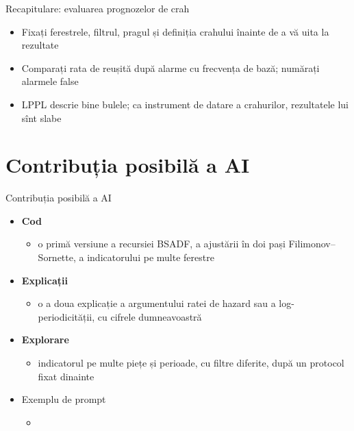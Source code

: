 \begin{frame}{Recapitulare: evaluarea prognozelor de crah}
\itemsize{\small}
\begin{itemize}
    \item Fixați ferestrele, filtrul, pragul și definiția crahului înainte de a vă uita la rezultate
    \item Comparați rata de reușită după alarme cu frecvența de bază; numărați alarmele false
    \item LPPL descrie bine bulele; ca instrument de datare a crahurilor, rezultatele lui sînt slabe
\end{itemize}
\end{frame}


\section{Contribuția posibilă a AI}

\begin{frame}{Contribuția posibilă a AI}
\itemsize{\small}
\begin{itemize}
    \item \textbf{Cod}
    \begin{itemize}
        \item o primă versiune a recursiei BSADF, a ajustării în doi pași Filimonov--Sornette, a indicatorului pe multe ferestre
    \end{itemize}
    \item \textbf{Explicații}
    \begin{itemize}
        \item o a doua explicație a argumentului ratei de hazard sau a log-periodicității, cu cifrele dumneavoastră
    \end{itemize}
    \item \textbf{Explorare}
    \begin{itemize}
        \item indicatorul pe multe piețe și perioade, cu filtre diferite, după un protocol fixat dinainte
    \end{itemize}
    \item Exemplu de prompt
    \begin{itemize}
        \item {}
    \end{itemize}
\end{itemize}
\end{frame}

